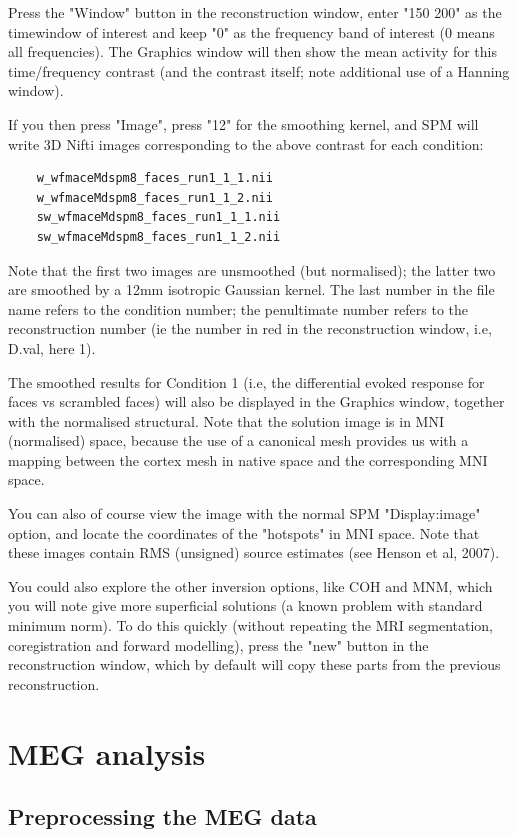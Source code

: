 \noindent * Press the "Window" button in the reconstruction window, enter "150 200" as the timewindow of interest and keep "0" as the frequency band of interest (0 means all frequencies). The Graphics window will then show the mean activity for this time/frequency contrast (and the contrast itself; note additional use of a Hanning window).

\noindent * If you then press "Image", press "12" for the smoothing kernel, and SPM will write 3D Nifti images corresponding to the above contrast for each condition:
\begin{verbatim}
    w_wfmaceMdspm8_faces_run1_1_1.nii
    w_wfmaceMdspm8_faces_run1_1_2.nii
    sw_wfmaceMdspm8_faces_run1_1_1.nii
    sw_wfmaceMdspm8_faces_run1_1_2.nii
\end{verbatim}
Note that the first two images are unsmoothed (but normalised); the latter two are smoothed by a 12mm isotropic Gaussian kernel. The last number in the file name refers to the condition number; the penultimate number refers to the reconstruction number (ie the number in red in the reconstruction window, i.e, D.val, here 1).

The smoothed results for Condition 1 (i.e, the differential evoked response for faces vs scrambled faces) will also be displayed in the Graphics window, together with the normalised structural. Note that the solution image is in MNI (normalised) space, because the use of a canonical mesh provides us with a mapping between the cortex mesh in native space and the corresponding MNI space.

You can also of course view the image with the normal SPM "Display:image" option, and locate the coordinates of the "hotspots" in MNI space. Note that these images contain RMS (unsigned) source estimates (see Henson et al, 2007).

You could also explore the other inversion options, like COH and MNM, which you will note give more superficial solutions (a known problem with standard minimum norm). To do this quickly (without repeating the MRI segmentation, coregistration and forward modelling), press the "new" button in the reconstruction window, which by default will copy these parts from the previous reconstruction.


\section{MEG analysis}

\subsection{Preprocessing the MEG data}

